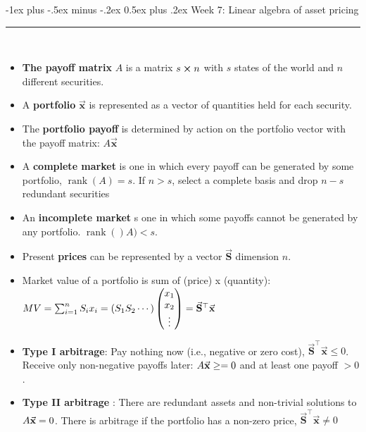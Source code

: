 \documentclass[10pt,landscape,a4paper]{article}
\makeatletter
\renewcommand{\section}{\@startsection{section}{1}{0mm}%
                                {-1ex plus -.5ex minus -.2ex}%
                                {0.5ex plus .2ex}%
                                {\normalfont\large\bfseries}}
\makeatother
\begin{document}
\begin{multicols*}{3}
\begin{description}[topsep=0pt]
\begin{itemize}[topsep=0pt]
	\end{itemize}
\end{description}



\section{Week 7: Linear algebra of asset pricing}\smallskip \hrule height 1pt \smallskip


\begin{description}[topsep=0pt]
	\item[Linear algebra of asset pricing] ~	
	\begin{itemize}[topsep=0pt]
		\item  \textbf{The payoff matrix} $A$ is a matrix $s \cross n$ with $s$ states of the world and $n$ different securities.
		\item A \textbf{portfolio} $\vec{\mathbf{x}}$ is represented as a vector of quantities held for each security.
		\item The \textbf{portfolio payoff} is determined by action on the portfolio vector with the payoff matrix: $A\vec{\mathbf{x}}$
		\item A \textbf{complete market}  is one in which every payoff can be generated by some portfolio, $\operatorname{rank}(A) = s$. If $n > s$, select a complete basis and drop $n-s$ redundant securities
		\item An \textbf{incomplete market} s one in which some payoffs cannot be generated
		by any portfolio. $\operatorname{rank}()A) < s$.
		\item Present \textbf{prices} can be represented by a vector $\vec{\mathbf{S}}$ dimension $n$.
		\item Market value of a portfolio is sum of (price) x (quantity): $MV = \sum_{i=1}^{n}S_i x_i = (S_1 \space S_2 \space \cdots) \begin{pmatrix} x_1 \\ x_2 \\ \vdots \end{pmatrix} = \vec{\mathbf{S}}^\top \vec{\mathbf{x}}$
		\item \textbf{Type I arbitrage}: Pay nothing now (i.e., negative or zero cost), $\vec{\mathbf{S}}^\top \vec{\mathbf{x}} \leq 0$. Receive only non-negative payoffs later: $A \vec{\bf x } \geq =0$ and at least one payoff $>0$.
		\item \textbf{Type II arbitrage} : There are redundant assets and non-trivial solutions to $A \vec{\bf x } =0$. There is arbitrage if the portfolio has a non-zero price, $\vec{\mathbf{S}}^\top \vec{\mathbf{x}} \neq 0$

\end{itemize}
\end{description}
\end{multicols*}
\end{document}
